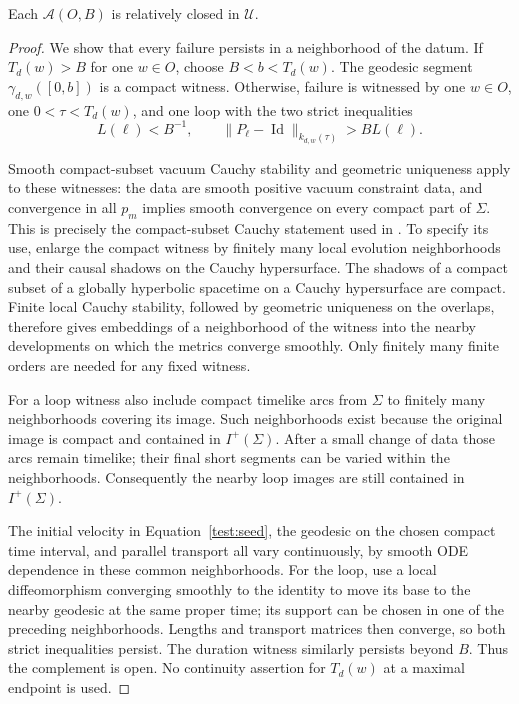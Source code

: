 \begin{lemma}[Closedness]\label{test:closed}
Each $\mathcal A(O,B)$ is relatively closed in $\mathcal U$.
\end{lemma}

\begin{proof}
We show that every failure persists in a neighborhood of the datum.
If $T_d(w)>B$ for one $w\in O$, choose
$B<b<T_d(w)$. The geodesic segment $\gamma_{d,w}([0,b])$ is a
compact witness. Otherwise, failure is witnessed by one
$w\in O$, one $0<\tau<T_d(w)$, and one loop with the two strict
inequalities
\[
 L(\ell)<B^{-1},\qquad
 \lVert P_\ell-\operatorname{Id}\rVert_{k_{d,w}(\tau)}>B L(\ell).
\]

Smooth compact-subset vacuum Cauchy stability and geometric uniqueness
apply to these witnesses: the data are smooth positive vacuum
constraint data, and convergence in all $p_m$ implies smooth
convergence on every compact part of $\Sigma$. This is precisely the
compact-subset Cauchy statement used in
\cite[proof of ]{Foundation}. To specify its use, enlarge the
compact witness by finitely many local evolution neighborhoods and
their causal shadows on the Cauchy hypersurface. The shadows of a
compact subset of a globally hyperbolic spacetime on a Cauchy
hypersurface are compact. Finite local Cauchy stability, followed by
geometric uniqueness on the overlaps, therefore gives embeddings of
a neighborhood of the witness into the nearby developments on which
the metrics converge smoothly. Only finitely many finite orders are
needed for any fixed witness.

For a loop witness also include compact timelike arcs from $\Sigma$
to finitely many neighborhoods covering its image. Such neighborhoods
exist because the original image is compact and contained in
$I^+(\Sigma)$. After a small change of data those arcs remain timelike;
their final short segments can be varied within the neighborhoods.
Consequently the nearby loop images are still contained in
$I^+(\Sigma)$.

The initial velocity in Equation~\eqref{test:seed}, the geodesic on
the chosen compact time interval, and parallel transport all vary
continuously, by smooth ODE dependence in these common neighborhoods.
For the loop, use a local diffeomorphism converging smoothly to the
identity to move its base to the nearby geodesic at the same proper
time; its support can be chosen in one of the preceding neighborhoods.
Lengths and transport matrices then converge, so both strict
inequalities persist. The duration witness similarly persists beyond
$B$. Thus the complement is open. No continuity assertion for
$T_d(w)$ at a maximal endpoint is used.
\end{proof}

